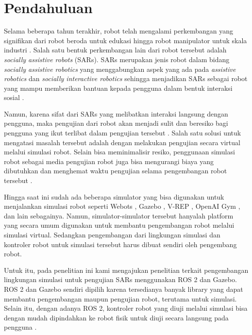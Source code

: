 \section{Pendahuluan}
\label{sec:pendahuluan}

Selama beberapa tahun terakhir, robot telah mengalami perkembangan yang signifikan dari robot beroda untuk edukasi \citep{goncalves2009} hingga robot manipulator untuk skala industri \citep{Blatnicky2020}.
Salah satu bentuk perkembangan lain dari robot tersebut adalah \emph{socially assistive robots} (SARs).
SARs merupakan jenis robot dalam bidang \emph{socially assistive robotics} yang menggabungkan aspek yang ada pada \emph{assistive robotics} dan \emph{socially interactive robotics} sehingga menjadikan SARs sebagai robot yang mampu memberikan bantuan kepada pengguna dalam bentuk interaksi sosial \citep{seifer2005}.

Namun, karena sifat dari SARs yang melibatkan interaksi langsung dengan pengguna, maka pengujian dari robot akan menjadi sulit dan beresiko bagi pengguna yang ikut terlibat dalam pengujian tersebut \citep{erickson2020}.
Salah satu solusi untuk mengatasi masalah tersebut adalah dengan melakukan pengujian secara virtual melalui simulasi robot.
Selain bisa meminimalisir resiko, penggunaan simulasi robot sebagai media pengujian robot juga bisa mengurangi biaya yang dibutuhkan dan menghemat waktu pengujian selama pengembangan robot tersebut \citep{takaya2016}.

Hingga saat ini sudah ada beberapa simulator yang bisa digunakan untuk menjalankan simulasi robot seperti Webots \citep{michel2004}, Gazebo \citep{koenig2004}, V-REP \citep{rohmer2013}, OpenAI Gym \citep{brockman2016}, dan lain sebagainya.
Namun, simulator-simulator tersebut hanyalah platform yang secara umum digunakan untuk membantu pengembangan robot melalui simulasi virtual.
Sedangkan pengembangan dari lingkungan simulasi dan kontroler robot untuk simulasi tersebut harus dibuat sendiri oleh pengembang robot.

Untuk itu, pada penelitian ini kami mengajukan penelitian terkait pengembangan lingkungan simulasi untuk pengujian SARs menggunakan ROS 2 dan Gazebo.
ROS 2 dan Gazebo sendiri dipilih karena tersedianya banyak library yang dapat membantu pengembangan maupun pengujian robot, terutama untuk simulasi.
Selain itu, dengan adanya ROS 2, kontroler robot yang diuji melalui simulasi bisa dengan mudah dipindahkan ke robot fisik untuk diuji secara langsung pada pengguna \citep{takaya2016}.
